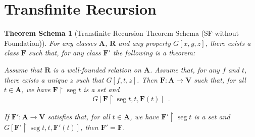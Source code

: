 \documentclass{book}
\newtheorem{thms}[ax]{Theorem Schema}
\theoremstyle{definition}
\newcommand{\seg}{\ensuremath{\operatorname{seg}}}
\begin{document}
\section{Transfinite Recursion}

\begin{thms}[Transfinite Recursion Theorem Schema (SF without Foundation)]
For any classes $\mathbf{A}$, $\mathbf{R}$ and any property $G[x,y,z]$, there exists a class $\mathbf{F}$ such that, for any class $\mathbf{F}'$ the following is a theorem:

Assume that $\mathbf{R}$ is a well-founded relation on $\mathbf{A}$. Assume that, for any $f$ and $t$, there exists a unique $z$ such that $G[f,t,z]$. Then $\mathbf{F} : \mathbf{A} \rightarrow \mathbf{V}$ such that, for all $t \in \mathbf{A}$, we have $\mathbf{F} \restriction \seg t$ is a set and
\[ G[\mathbf{F} \restriction \seg t, t, \mathbf{F}(t)] \enspace . \]

If $\mathbf{F}' : \mathbf{A} \rightarrow \mathbf{V}$ satisfies that, for all $t \in \mathbf{A}$, we have $\mathbf{F}' \restriction \seg t$ is a set and $G[\mathbf{F}' \restriction \seg t, t, \mathbf{F}'(t)]$, then $\mathbf{F}' = \mathbf{F}$.
\end{thms}
\end{document}
